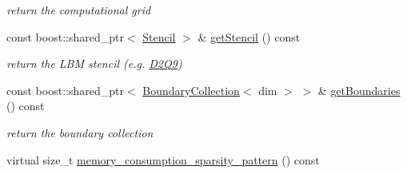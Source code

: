 \begin{DoxyCompactItemize}
\begin{DoxyCompactList}\small\item\em return the computational grid \item\end{DoxyCompactList}\item 
\hypertarget{classnatrium_1_1AdvectionOperator_a15e11e1df8d26eefcfc701eece00f1c6}{
const boost::shared\_\-ptr$<$ \hyperlink{classnatrium_1_1Stencil}{Stencil} $>$ \& \hyperlink{classnatrium_1_1AdvectionOperator_a15e11e1df8d26eefcfc701eece00f1c6}{getStencil} () const }
\label{classnatrium_1_1AdvectionOperator_a15e11e1df8d26eefcfc701eece00f1c6}

\begin{DoxyCompactList}\small\item\em return the LBM stencil (e.g. \hyperlink{classnatrium_1_1D2Q9}{D2Q9}) \item\end{DoxyCompactList}\item 
\hypertarget{classnatrium_1_1AdvectionOperator_a072f5f90fc914c6e9ac5a7295d6bc84e}{
const boost::shared\_\-ptr$<$ \hyperlink{classnatrium_1_1BoundaryCollection}{BoundaryCollection}$<$ dim $>$ $>$ \& \hyperlink{classnatrium_1_1AdvectionOperator_a072f5f90fc914c6e9ac5a7295d6bc84e}{getBoundaries} () const }
\label{classnatrium_1_1AdvectionOperator_a072f5f90fc914c6e9ac5a7295d6bc84e}

\begin{DoxyCompactList}\small\item\em return the boundary collection \item\end{DoxyCompactList}\item 
\hypertarget{classnatrium_1_1AdvectionOperator_a37ad28637da38eb776ba3eca89a0820c}{
virtual size\_\-t \hyperlink{classnatrium_1_1AdvectionOperator_a37ad28637da38eb776ba3eca89a0820c}{memory\_\-consumption\_\-sparsity\_\-pattern} () const }
\label{classnatrium_1_1AdvectionOperator_a37ad28637da38eb776ba3eca89a0820c}


\end{DoxyCompactItemize}
